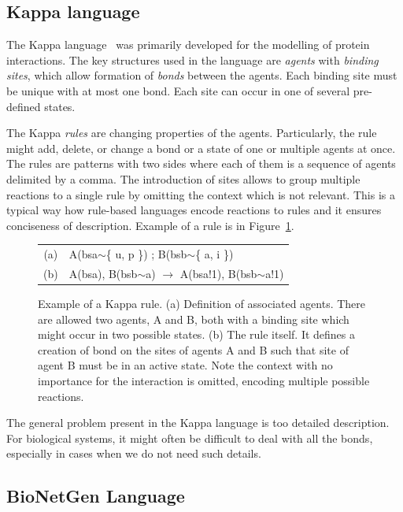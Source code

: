\documentclass[11pt,a4paper]{report}
\begin{document}
\subsection{Kappa language}
\label{kappa}

The Kappa language~\cite{kappa_formal} was primarily developed for the modelling of protein interactions. The key structures used in the language are \emph{agents} with \emph{binding sites}, which allow formation of \emph{bonds} between the agents. Each binding site must be unique with at most one bond. Each site can occur in one of several pre-defined states.

The Kappa \emph{rules} are changing properties of the agents. Particularly, the rule might add, delete, or change a bond or a state of one or multiple agents at once. The rules are patterns with two sides where each of them is a sequence of agents delimited by a comma. The introduction of sites allows to group multiple reactions to a single rule by omitting the context which is not relevant. This is a typical way how rule-based languages encode reactions to rules and it ensures conciseness of description. Example of a rule is in Figure~\ref{kappa-rule}.

\begin{figure}[!h]
\begin{center}
\begin{tabular}{c l}
(a) & A(bsa$\sim$\{ u, p \}) ; B(bsb$\sim$\{ a, i \}) \\
(b) & A(bsa), B(bsb$\sim$a) $\rightarrow$ A(bsa!1), B(bsb$\sim$a!1) \\
\end{tabular}
\end{center}
\caption{Example of a Kappa rule. (a) Definition of associated agents. There are allowed two agents, A and B, both with a binding site which might occur in two possible states. (b) The rule itself. It defines a creation of bond on the sites of agents A and B such that site of agent B must be in an active state. Note the context with no importance for the interaction is omitted, encoding multiple possible reactions.}\label{kappa-rule}
\end{figure}

The general problem present in the Kappa language is too detailed description. For biological systems, it might often be difficult to deal with all the bonds, especially in cases when we do not need such details.

\subsection{BioNetGen Language}
\label{bngl}
\end{document}
